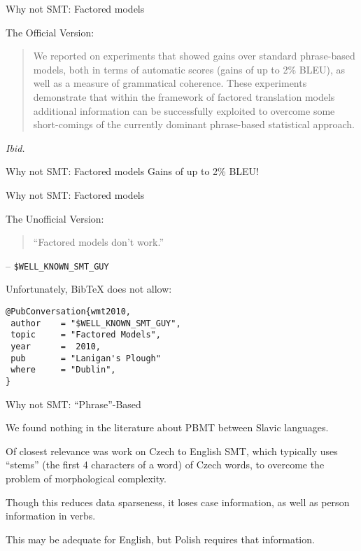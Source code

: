 \documentclass{beamer}
\begin{document}
\begin{frame}{Why not SMT: Factored models}

The Official Version:

\begin{quote}
We reported on experiments that showed gains
over standard phrase-based models, both in terms
of automatic scores (gains of up to 2\% BLEU), as
well as a measure of grammatical coherence. These
experiments demonstrate that within the framework
of factored translation models additional information
can be successfully exploited to overcome some
short-comings of the currently dominant phrase-based
statistical approach.
\end{quote}

\hbox{}

{\footnotesize\em Ibid.}
\end{frame}

\begin{frame}{Why not SMT: Factored models}
Gains of up to 2\% BLEU!
\end{frame}

\begin{frame}[fragile]{Why not SMT: Factored models}

The Unofficial Version:

\begin{quote}
``Factored models don't work.''
\end{quote}

\hbox{}

{\footnotesize 
-- {\tt \$WELL\_KNOWN\_SMT\_GUY}
}

\pause
\hbox{}

{\footnotesize
Unfortunately, BibTeX does not allow:

\begin{verbatim}
@PubConversation{wmt2010,
 author    = "$WELL_KNOWN_SMT_GUY",
 topic     = "Factored Models",
 year      =  2010,
 pub       = "Lanigan's Plough"
 where     = "Dublin",
}
\end{verbatim}
}
\end{frame}

%
%
%
%
%
%

\begin{frame}{Why not SMT: ``Phrase''-Based}

We found nothing in the literature about PBMT between Slavic languages.

Of closest relevance was work on Czech to English SMT, which typically
uses ``stems'' (the first 4 characters of a word) of Czech words, to
overcome the problem of morphological complexity.

Though this reduces data sparseness, it loses case information, as
well as person information in verbs. 

This may be adequate for English, but Polish requires that information.
\end{frame}
\end{document}
